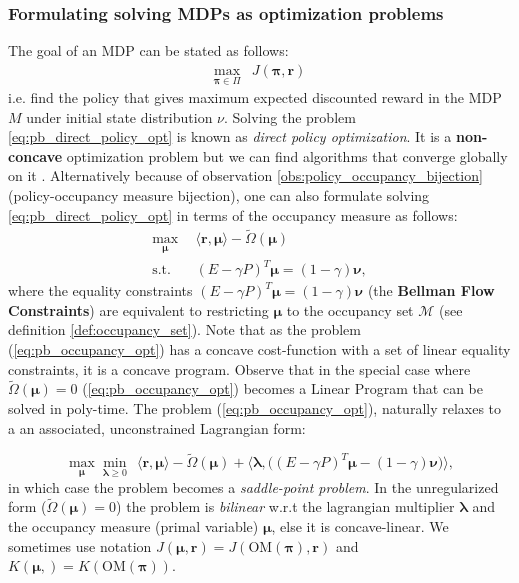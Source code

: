 \subsubsection{Formulating solving MDPs as optimization problems} \label{sec:opt_sol_mdp}

The goal of an MDP can be stated as follows:
\begin{align}
    \max_{\bm{\pi} \in \Pi} &J(\bm{\pi},\bm{r})
    \label{eq:pb_direct_policy_opt}
\end{align}
i.e. find the policy that gives maximum expected discounted reward in the MDP $\textit{M}$ under initial state distribution $\nu$. Solving the problem \ref{eq:pb_direct_policy_opt} is known as \textit{direct policy optimization}. It is a \textbf{non-concave} optimization problem but we can find algorithms that converge globally on it \cite{Agarwal2020}. Alternatively because of observation \ref{obs:policy_occupancy_bijection} (policy-occupancy measure bijection), one can also formulate solving \ref{eq:pb_direct_policy_opt} in terms of the occupancy measure as follows:
\begin{equation}
    \begin{aligned}
        \max_{\bm{\mu}} & ~~ \langle \bm{r}, \bm{\bm{\mu}} \rangle - \tilde{\Omega}(\bm{\mu})\\
        \text{s.t.} & ~~  (E-\gamma P)^T  \bm{\mu} = (1-\gamma) \bm{\nu},
    \end{aligned}
    \label{eq:pb_occupancy_opt}
\end{equation}
where the equality constraints $ (E-\gamma P)^T  \bm{\mu} = (1-\gamma) \bm{\nu}$ (the \textbf{Bellman Flow Constraints}) are equivalent to restricting $\bm{\mu}$ to the occupancy set $\mathcal{M}$ (see definition \ref{def:occupancy_set}). Note that as the problem (\ref{eq:pb_occupancy_opt}) has a concave cost-function with a set of linear equality constraints, it is a concave program. Observe that in the special case where $\tilde{\Omega}(\bm{\mu})=0$ (\ref{eq:pb_occupancy_opt}) becomes a Linear Program that can be solved in poly-time. The problem (\ref{eq:pb_occupancy_opt}), naturally relaxes to a an associated, unconstrained Lagrangian form:

\begin{equation}
    \max_{\bm{\mu}} \min_{\bm{\lambda} \geq 0 }~~ 
    \langle \bm{r}, \bm{\bm{\mu}} \rangle
    - \tilde{\Omega}(\bm{\mu}) 
    + \langle \bm{\lambda}, \big((E-\gamma P)^T  \bm{\mu} - (1-\gamma) \bm{\nu} \big)\rangle,
    \label{eq:pb_occupancy_lagrangian_opt}
\end{equation}
in which case the problem becomes a \textit{saddle-point problem}. In the unregularized form ($\tilde{\Omega}(\bm{\mu})=0$) the problem is \textit{bilinear} w.r.t the lagrangian multiplier $\bm{\lambda}$ and the occupancy measure (primal variable) $\bm{\mu}$, else it is concave-linear. We sometimes use notation $J(\bm{\mu},\bm{r}) = J(\text{OM}(\bm{\pi}),\bm{r})$ and $K(\bm{\mu},) = K(\text{OM}(\bm{\pi}))$.